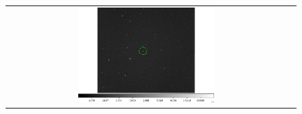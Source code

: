 \documentclass[letterpaper,12pt]{article}
\begin{document}
\begin{figure}[h!]
\begin{tabular}{cc}
                                                                                                                                                                                                                                                                                                                                                                                                                                                                                                                                                                                                                                                                                                                                                                                                                                     \includegraphics[width=0.5\textwidth]{asteroid_20.png} \\


\end{tabular}
\end{figure}
\end{document}

